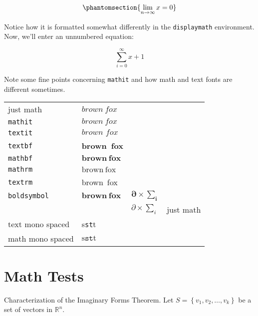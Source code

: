 \begin{equation}\phantomsection{
\lim_{n\rightarrow \infty}x=0
}\label{eq-oneequation}\end{equation}

Notice how it is formatted somewhat differently in the
\texttt{displaymath} environment. Now, we'll enter an unnumbered
equation:

\[\sum_{i=0}^{\infty} x + 1\]

Note some fine points concerning \texttt{mathit} and
how math and text fonts are different sometimes.

\begin{center}
  \begin{tabular}[c]{|l|l|l|l|}
    just math & $brown~fox$ \\
    \texttt{mathit} & $\mathit{brown~fox}$ \\
    \texttt{textit} & $\textit{brown~fox}$ \\
    \texttt{textbf}& \textbf{brown~fox} \\
    \texttt{mathbf}& $\mathbf{brown~fox}$ \\
    \texttt{mathrm}& $\mathrm{brown~fox}$ \\
    \texttt{textrm}& \textrm{brown~fox} \\
    \texttt{boldsymbol}& $\boldsymbol{brown~fox}$ & $\boldsymbol{\partial\times\sum_i}$\\
              && $\partial\times\sum_i$&just math \\
    text mono spaced& s\texttt{st}t &\\
    math mono spaced& $\mathrm{s}\mathtt{st}\mathrm{t}$&
  \end{tabular}
\end{center}


\section{Math Tests}

Characterization of the Imaginary Forms
Theorem.
Let $S=\left\{v_1, v_2, \ldots, v_k\right\}$ be a set of vectors in $\mathbb{R}^n$.



